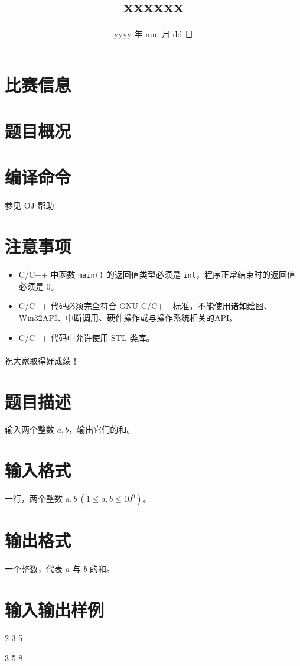 \documentclass{../cpct/ctpro}
\title{xxxxxx}
\date{yyyy 年 mm 月 dd 日}
\begin{document}
\maketitle
{}

\section*{比赛信息}


\section*{题目概况}

\problemtab

\section*{编译命令}

参见 OJ 帮助

\section*{注意事项}

\begin{itemize}
    \item C/C++ 中函数 \verb|main()| 的返回值类型必须是 \verb|int|，程序正常结束时的返回值必须是 $0$。
    \item C/C++ 代码必须完全符合 GNU C/C++ 标准，不能使用诸如绘图、Win32API、中断调用、硬件操作或与操作系统相关的API。
    \item C/C++ 代码中允许使用 STL 类库。
\end{itemize}

\paragraph*{} 祝大家取得好成绩！

\makeproblem
\section*{题目描述}

输入两个整数 $a,b$，输出它们的和。

\section*{输入格式}

一行，两个整数 $a,b~(1 \leq a,b \leq {10}^9)$。

\section*{输出格式}

一个整数，代表 $a$ 与 $b$ 的和。

\section*{输入输出样例}

\testcasetab
{
    2 3
}
{
    5
}

\testcasetab
{
    3 5
}
{
    8
}
\end{document}
